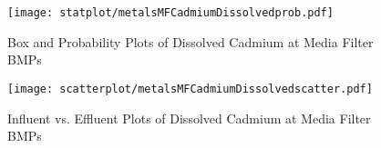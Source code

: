         \begin{figure}[hb]   %
            \centering
            \texttt{[image: statplot/metalsMFCadmiumDissolvedprob.pdf]}
            \caption{Box and Probability Plots of Dissolved Cadmium at Media Filter BMPs}
        \end{figure}         %
        
        
        \begin{figure}[hb]   %
            \centering
            \texttt{[image: scatterplot/metalsMFCadmiumDissolvedscatter.pdf]}
            \caption{Influent vs. Effluent Plots of Dissolved Cadmium at Media Filter BMPs}
        \end{figure}         %
        \clearpage
        